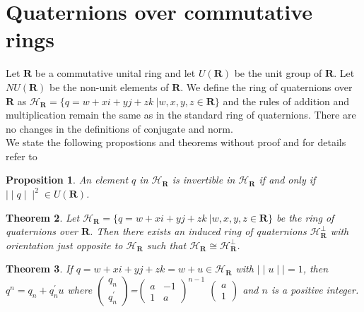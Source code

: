 \documentclass[sn-mathphys,Numbered]{sn-jnl}%
\theoremstyle{thmstyleone}
\newtheorem{theorem}{Theorem}
\newtheorem{proposition}[theorem]{Proposition}
\theoremstyle{thmstyletwo}
\theoremstyle{thmstylethree}
\begin{document}
\section{Quaternions over commutative rings}
Let $\mathbf{R}$ be a commutative unital ring and let $U(\mathbf{R})$ be the unit group of $\mathbf{R}$. Let $NU(\mathbf{R})$ be the non-unit elements of $\mathbf{R}$. 
We define the ring of quaternions over $\mathbf{R}$ as $\mathcal{H_{\mathbf{R}}}=\{ q=w+xi+yj+zk \ | w,x,y,z\in \mathbf{R}\}$ and the rules of addition and multiplication remain the same as in the standard ring of quaternions. There are no changes in the definitions of conjugate and norm. \\
We state the following propostions and theorems without proof and for details refer to \cite{ath3} \\
\begin{proposition}
An element $q$ in $\mathcal{H_{\mathbf{R}}}$ is invertible in $\mathcal{H_{\mathbf{R}}}$ if and only if $\mid\mid q \mid\mid^{2} \in U(\mathbf{R})$. 
\end{proposition}
\begin{theorem}
Let $\mathcal{H_{\mathbf{R}}}=\{ q=w+xi+yj+zk \ | w,x,y,z\in \mathbf{R}\}$ be the ring of quaternions over $\mathbf{R}$. Then there exists an induced ring of quaternions $\mathcal{H_{\mathbf{R}}^{\perp}}$ with orientation just opposite to $\mathcal{H_{\mathbf{R}}}$ such that $\mathcal{H}_{\mathbf{R}}\cong\mathcal{H_{\mathbf{R}}^{\perp}}$. 
\end{theorem}
\begin{theorem}
If $q=w+xi+yj+zk=w+u \in \mathcal{H_{\mathbf{R}}}$ with $\mid\mid u \mid\mid=1$, then $q^{n}=q_{n}+q_{n}^{\prime}u$ where $\left( \begin{array}{c} q_{n} \\
q_{n}^{\prime}\end{array}\right)$=$\left(\begin{array}{cc} a & -1 \\ 1 & a\end{array} \right)^{n-1}$ $\left( \begin{array}{c} a \\
1 \end{array}\right)$ and $n$ is a positive integer.
\end{theorem}
\end{document}
